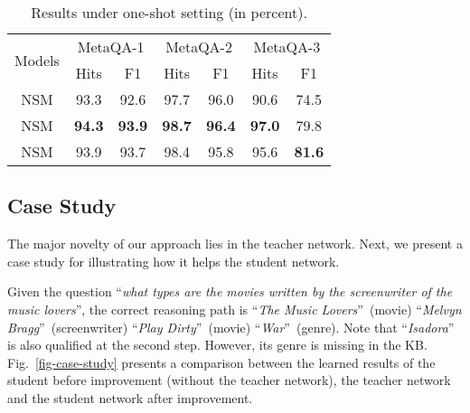 
\begin{table}[htbp]
	\centering
	\caption{Results under one-shot setting (in percent).}
	\label{tab:res-1shot}\begin{tabular}{c c c |c c |c c }
\hline
			\multirow{2}{*}{Models}&\multicolumn{2}{c}{MetaQA-1}&\multicolumn{2}{c}{MetaQA-2}&\multicolumn{2}{c}{MetaQA-3}\\
			\cline{2-7}
			&Hits&F1&Hits&F1&Hits&F1\\
			\hline
			NSM	&	 93.3& 92.6 &  97.7& 96.0& 90.6& 74.5\\
			\hline
			NSM&	 \textbf{94.3}&  \textbf{93.9}&  \textbf{98.7}& \textbf{96.4}& \textbf{97.0}& 79.8\\
NSM&	 93.9&  93.7&  98.4& 95.8& 95.6& \textbf{81.6}\\
			\hline
		\end{tabular}\end{table}

\subsection{Case Study}




The major novelty of our approach lies in the teacher network.   Next, we present a case study for illustrating how it helps the student network.

Given the question ``\emph{what types are the movies written by the screenwriter of the music lovers}'', the correct reasoning path is 
 ``\emph{The Music Lovers}''~(movie)   ``\emph{Melvyn Bragg}''~(screenwriter)  ``\emph{Play Dirty}''~(movie)  ``\emph{War}''~(genre). Note that ``\emph{Isadora}'' is also qualified at the second step.
However, its genre is missing in the KB.
Fig.~\ref{fig-case-study} presents a comparison between the learned results of the student before improvement (\ie without the teacher network), the teacher network and the student network after improvement. 





